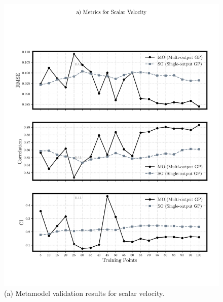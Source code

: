 \documentclass[draft,linenumbers,onecolumn]{agujournal2019} %
\begin{document}
\begin{figure}[!htbp]
	\centering
	\begin{minipage}[b]{0.49\textwidth}
		\centering
		\includegraphics[width=\textwidth]{images/8a_meta-validation-SV.png}
		\caption{(a) Metamodel validation results for scalar velocity.}
		\label{fig:meta_validation_sv}
	\end{minipage}
	\hfill
	\begin{minipage}[b]{0.49\textwidth}
		\centering

\end{minipage}
\end{figure}
\end{document}
